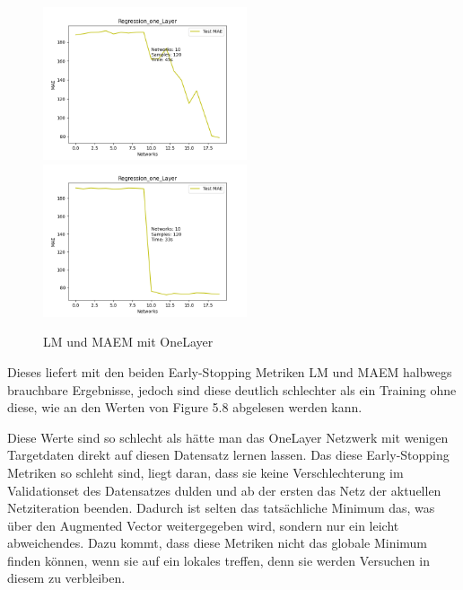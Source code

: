 \begin{figure}[htpb]
    \includegraphics[height=4.5cm]{../../Plots/ba_plots/earlystopping/lossmetric/onelayer_ts.png}
    \includegraphics[height=4.5cm]{../../Plots/ba_plots/earlystopping/intermetric/onelayer_ts.png}
    \caption{\label{fig:onelayermetrics} LM und MAEM mit OneLayer}
\end{figure}

Dieses liefert mit den beiden Early-Stopping Metriken LM und MAEM 
halbwegs brauchbare Ergebnisse, jedoch sind diese deutlich schlechter als ein Training ohne diese, wie an den Werten von Figure 5.8 abgelesen 
werden kann. 

Diese Werte sind so schlecht als hätte man das OneLayer Netzwerk mit wenigen Targetdaten direkt auf diesen Datensatz lernen lassen. 
Das diese Early-Stopping Metriken so schleht sind, liegt daran, dass sie keine Verschlechterung im Validationset des Datensatzes dulden und ab 
der ersten das Netz der aktuellen Netziteration beenden. Dadurch ist selten das tatsächliche Minimum das, was über den Augmented Vector 
weitergegeben wird, sondern nur ein leicht abweichendes. Dazu kommt, dass diese Metriken nicht das globale Minimum finden können, wenn sie 
auf ein lokales treffen, denn sie werden Versuchen in diesem zu verbleiben. 
